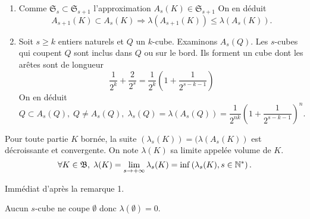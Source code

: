 \begin{rems}
 \begin{enumerate}
  \item Comme $\mathfrak{S}_s \subset \mathfrak{S}_{s+1}$ l'approximation $A_s(K)\in \mathfrak{S}_{s+1}$ On en déduit
\begin{displaymath}
 A_{s+1}(K) \subset A_s(K) \Rightarrow \lambda(A_{s+1}(K)) \leq \lambda(A_s(K)) .
\end{displaymath}
  \item Soit $s \geq k$ entiers naturels et $Q$ un $k$-cube. Examinons $A_s(Q)$.\newline
  Les $s$-cubes qui coupent $Q$ sont inclus dans $Q$ ou sur le bord. Ils forment un cube dont les arêtes sont de longueur
  \begin{displaymath}
    \frac{1}{2^k} + \frac{2}{2^s} = \frac{1}{2^k}\left( 1 + \frac{1}{2^{s-k-1}} \right)
  \end{displaymath}
  On en déduit
  \begin{displaymath}
   Q \subset A_s(Q), \; Q \neq A_s(Q), \; \lambda_s(Q) = \lambda(A_s(Q)) =  \frac{1}{2^{nk}}(1 + \frac{1}{2^{s-k-1}})^n.
  \end{displaymath}
 \end{enumerate}
\end{rems}

\begin{defi}
Pour toute partie $K$ bornée, la suite $(\lambda_s(K)) = (\lambda(A_s(K))$ est décroissante et convergente. On note $\lambda(K)$ sa limite appelée volume de $K$.
\begin{displaymath}
  \forall K \in \mathfrak{B}, \; \lambda(K) = \lim_{s\rightarrow +\infty} \lambda_s(K) = \inf\left( \lambda_s(K), s \in \mathbb{N}^*\right).
\end{displaymath}
\end{defi}
\begin{demo}
 Immédiat d'après la remarque 1.
\end{demo}
\begin{rem}
  Aucun $s$-cube ne coupe $\emptyset$ donc  $\lambda(\emptyset)=0$.
\end{rem}

